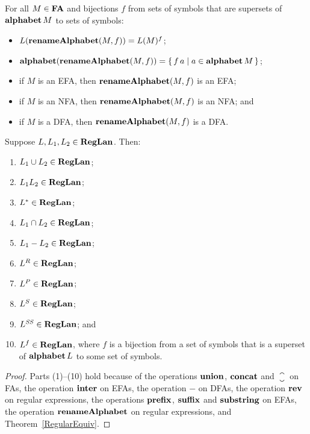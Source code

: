 \begin{theorem}
For all $M\in\mathbf{FA}$ and bijections $f$ from sets of symbols that
are supersets of $\mathbf{alphabet}\,M$ to sets of symbols:
\begin{itemize}
\item $L(\mathbf{renameAlphabet}(M,f)) = L(M)^f$;

\item $\mathbf{alphabet}(\mathbf{renameAlphabet}(M,f)) =
\{ \, f\,a \mid a\in\mathbf{alphabet}\,M \, \}$;

\item if $M$ is an EFA, then $\mathbf{renameAlphabet}(M,f)$ is an EFA;

\item if $M$ is an NFA, then $\mathbf{renameAlphabet}(M,f)$ is an NFA; and

\item if $M$ is a DFA, then $\mathbf{renameAlphabet}(M,f)$ is a DFA.
\end{itemize}
\end{theorem}

\begin{theorem}
\label{ClosurePropTheorem}
Suppose $L,L_1,L_2\in\mathbf{RegLan}$.
Then:
\begin{enumerate}[\quad(1)]
\item $L_1\cup L_2\in\mathbf{RegLan}$;

\item $L_1L_2\in\mathbf{RegLan}$;

\item $L^*\in\mathbf{RegLan}$;

\item $L_1\cap L_2\in\mathbf{RegLan}$;

\item $L_1 - L_2\in\mathbf{RegLan}$;

\item $L^R\in\mathbf{RegLan}$;

\item $L^P\in\mathbf{RegLan}$;

\item $L^S\in\mathbf{RegLan}$;

\item $L^{\mathit{SS}}\in\mathbf{RegLan}$; and

\item $L^f\in\mathbf{RegLan}$, where $f$ is a bijection from a set of symbols
that is a superset of $\mathbf{alphabet}\,L$ to some set of symbols.
\end{enumerate}
\end{theorem}

\begin{proof}
Parts (1)--(10) hold because of the operations $\mathbf{union}$, $\mathbf{concat}$
and $\closure$ on FAs, the operation $\mathbf{inter}$ on EFAs, the
operation $\minus$ on DFAs, the operation $\mathbf{rev}$ on regular
expressions, the operations $\mathbf{prefix}$, $\mathbf{suffix}$ and $\mathbf{substring}$ on
EFAs, the operation $\mathbf{renameAlphabet}$ on regular expressions, and
Theorem~\ref{RegularEquiv}.
\end{proof}

